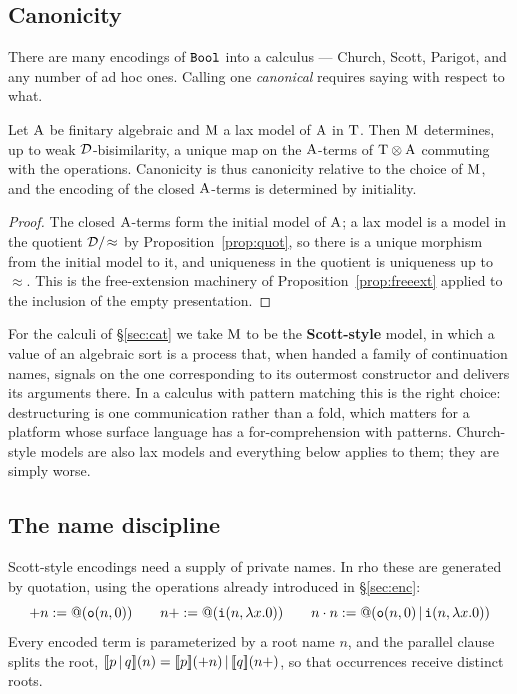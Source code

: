 \documentclass{article}
\begin{document}
\subsection{Canonicity}

There are many encodings of $\mathtt{Bool}$ into a calculus --- Church, Scott, Parigot, and any number of ad hoc ones. Calling one \emph{canonical} requires saying with respect to what.

\begin{proposition}
\label{prop:canon}
    Let $\mathrm{A}$ be finitary algebraic and $\mathrm{M}$ a lax model of $\mathrm{A}$ in $\mathrm{T}$. Then $\mathrm{M}$ determines, up to weak $\mathcal{D}$-bisimilarity, a unique map on the $\mathrm{A}$-terms of $\mathrm{T}\otimes\mathrm{A}$ commuting with the operations. Canonicity is thus canonicity relative to the choice of $\mathrm{M}$, and the encoding of the closed $\mathrm{A}$-terms is determined by initiality.
\end{proposition}
\begin{proof}
    The closed $\mathrm{A}$-terms form the initial model of $\mathrm{A}$; a lax model is a model in the quotient $\mathcal{D}/\!\approx$ by Proposition~\ref{prop:quot}, so there is a unique morphism from the initial model to it, and uniqueness in the quotient is uniqueness up to $\approx$. This is the free-extension machinery of Proposition~\ref{prop:freeext} applied to the inclusion of the empty presentation.
\end{proof}

For the calculi of \S\ref{sec:cat} we take $\mathrm{M}$ to be the \textbf{Scott-style} model, in which a value of an algebraic sort is a process that, when handed a family of continuation names, signals on the one corresponding to its outermost constructor and delivers its arguments there. In a calculus with pattern matching this is the right choice: destructuring is one communication rather than a fold, which matters for a platform whose surface language has a for-comprehension with patterns. Church-style models are also lax models and everything below applies to them; they are simply worse.

\subsection{The name discipline}
\label{sec:names}

Scott-style encodings need a supply of private names. In rho these are generated by quotation, using the operations already introduced in \S\ref{sec:enc}:
\[+n := @(\mathtt{o}(n,0))\qquad n+ := @(\mathtt{i}(n,\lambda x.0))\qquad n\cdot n := @(\mathtt{o}(n,0)\,|\,\mathtt{i}(n,\lambda x.0))\]
Every encoded term is parameterized by a root name $n$, and the parallel clause splits the root, $[\![p\,|\, q]\!](n)=[\![p]\!](+n)\,|\,[\![q]\!](n+)$, so that occurrences receive distinct roots.
\end{document}
